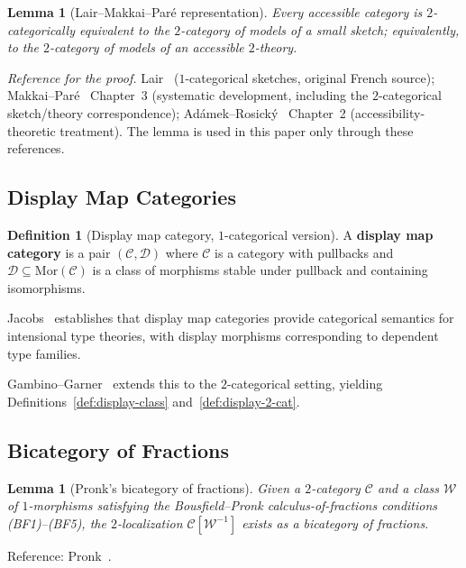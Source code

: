 \documentclass[11pt]{article}
\theoremstyle{plain}
\newtheorem{lemma}[theorem]{Lemma}
\theoremstyle{definition}
\newtheorem{definition}[theorem]{Definition}
\newcommand{\cC}{\mathcal{C}}
\newcommand{\cD}{\mathcal{D}}
\newcommand{\Mor}{\mathrm{Mor}}
\begin{document}
\begin{lemma}[Lair--Makkai--Par\'e representation]\label{lem:lair}
Every accessible category is $2$-categorically equivalent to the $2$-category of models of a small sketch; equivalently, to the $2$-category of models of an accessible $2$-theory.
\end{lemma}

\noindent\emph{Reference for the proof.} Lair~\cite{Lair1981} ($1$-categorical sketches, original French source); Makkai--Par\'e~\cite{MakkaiPare1989} Chapter~3 (systematic development, including the $2$-categorical sketch/theory correspondence); Ad\'amek--Rosick\'y~\cite{AdamekRosicky1994} Chapter~2 (accessibility-theoretic treatment).  The lemma is used in this paper only through these references.

\subsection{Display Map Categories}

\begin{definition}[Display map category, $1$-categorical version]\label{def:display-1cat}
A \textbf{display map category} is a pair $(\cC, \cD)$ where $\cC$ is a category with pullbacks and $\cD \subseteq \Mor(\cC)$ is a class of morphisms stable under pullback and containing isomorphisms.
\end{definition}

Jacobs~\cite{Jacobs1999} establishes that display map categories provide categorical semantics for intensional type theories, with display morphisms corresponding to dependent type families.

Gambino--Garner~\cite{GambinoGarner2008} extends this to the $2$-categorical setting, yielding Definitions~\ref{def:display-class} and~\ref{def:display-2-cat}.

\subsection{Bicategory of Fractions}

\begin{lemma}[Pronk's bicategory of fractions]\label{lem:pronk}
Given a $2$-category $\cC$ and a class $\mathcal{W}$ of $1$-morphisms satisfying the Bousfield--Pronk calculus-of-fractions conditions (BF1)--(BF5), the $2$-localization $\cC[\mathcal{W}^{-1}]$ exists as a bicategory of fractions.
\end{lemma}

Reference: Pronk~\cite{Pronk1996}.
\end{document}
